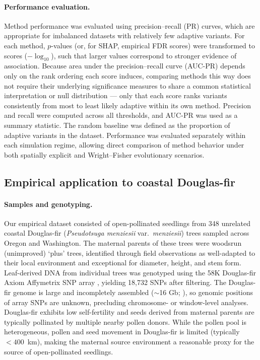 \documentclass[]{article}
\newcommand{\dfir}{Douglas-fir\xspace}
\begin{document}
\paragraph{Performance evaluation.}
Method performance was evaluated
using precision--recall (PR) curves,
which are appropriate for imbalanced datasets
with relatively few adaptive variants.
For each method,
$p$-values (or, for SHAP, empirical FDR scores) were transformed to scores
($-\log_{10}$),
such that larger values correspond
to stronger evidence of association.
Because area under the precision--recall curve (AUC-PR) depends only
on the rank ordering each score induces,
comparing methods this way does not require their underlying
significance measures to share a common statistical interpretation
or null distribution --- only that each score ranks variants
consistently from most to least likely adaptive within its own method.
Precision and recall were computed
across all thresholds, and AUC-PR 
was used as a summary statistic.
The random baseline was defined
as the proportion of adaptive variants
in the dataset. Performance was evaluated separately within each simulation regime,
allowing direct comparison of method behavior
under both spatially explicit and Wright--Fisher evolutionary scenarios.

\subsection{Empirical application to coastal \dfir}

\paragraph{Samples and genotyping.}
Our empirical dataset consisted of open-pollinated seedlings from
348 unrelated coastal \dfir
(\textit{Pseudotsuga menziesii} var.\ \textit{menziesii}) trees
sampled across Oregon and Washington.
The maternal parents of these trees were woodsrun (unimproved) `plus' trees,
identified through field observations as well-adapted to their local environment and exceptional
for diameter, height, and stem form. Leaf-derived DNA from individual trees was genotyped using the 58K \dfir
Axiom Affymetrix SNP array \citep{howe_axiom_2020}, yielding 18,732 SNPs
after filtering. %
The \dfir genome is large and incompletely
assembled ($\sim$16 Gb; \cite{neale_douglas-fir_2017}),
so genomic positions of array SNPs are unknown,
precluding chromosome- or window-level analyses.
\dfir exhibits low self-fertility and
seeds derived from maternal parents are typically pollinated by multiple nearby
pollen donors. While the pollen pool is heterogeneous, pollen and seed movement
in \dfir is limited (typically $<400$~km),
making the maternal source environment a reasonable proxy for the source of open-pollinated
seedlings.
\end{document}

